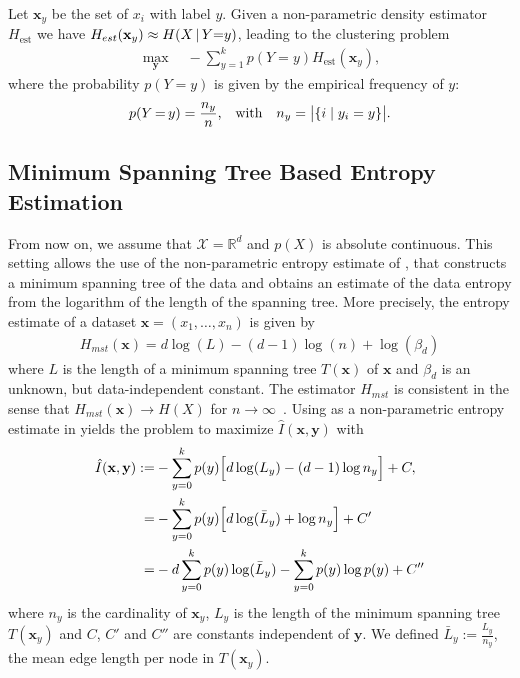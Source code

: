 Let $\mathbf{x}_y$ be the set of $x_i$ with label $y$. 
Given a non-parametric density estimator $H_\text{est}$
we have $H_{est}(\mathbf{x}_y) \approx H(X \, | \, Y {=} y)$, leading to the clustering problem
\begin{align}\label{eq:general_objective}
     \max_{\mathbf{y}}\quad - \sum_{y=1}^k p(Y{=}y) H_\text{est}(\mathbf{x}_y),
\end{align}
where the probability $p(Y{=}y)$ is given by the empirical frequency of $y$: 
\[
    p(Y\,{=}\,y)= \frac{n_y}{n} \text{,\quad with\quad} n_y = \bigl|\{i \mid y_i = y \}\bigr|.
\]

\subsection{Minimum Spanning Tree Based Entropy Estimation}
From now on, we assume that $\mathcal{X}=\mathbb{R}^d$ and $p(X)$ is
absolute continuous.
This setting allows the use of the non-parametric entropy estimate of
\citet{hero1999asymptotic}, that constructs a minimum spanning tree of the data
and obtains an estimate of the data entropy from the logarithm of the length of
the spanning tree.
%
More precisely, the entropy estimate of a dataset $\mathbf{x} = (x_1, \dotsc, x_n)$ is given by
\begin{align}\label{eq:hmst}
    H_{mst}(\mathbf{x}) = d \log(L) - (d-1) \log(n) + \log(\beta_d)
\end{align}
where $L$ is the length of a minimum spanning tree $T(\mathbf{x})$ of $\mathbf{x}$ and $\beta_d$ is an
unknown, but data-independent constant.
The estimator $H_{mst}$ is consistent in the sense that $H_{mst}(\mathbf{x}) \rightarrow H(X)$
for $n \rightarrow \infty$~\citep{hero1999asymptotic}.
Using  as a non-parametric entropy estimate in  yields
the problem to maximize $\hat{I}(\mathbf{x}, \mathbf{y})$ with
\begin{align}\label{eq:objective}
     \hat{I}(\mathbf{x}, \mathbf{y}) := & -\sum_{y=0}^k p(y) \Bigl[ d \log(L_y) - (d-1) \log{n_y} \Bigr] + C,\\
    = & - \sum_{y=0}^k p(y) \Bigl[ d \log(\bar{L}_y  ) + \log{n_y} \Bigr] + C'\\
    = & - d \sum_{y=0}^k p(y) \log(\bar{L}_y  ) - \sum_{y=0}^k p(y) \log{p(y) + C''} \label{eq:objective_simplified}
\end{align}
where $n_y$ is the cardinality of $\mathbf{x}_y$, $L_y$ is the length of the
minimum spanning tree $T(\mathbf{x}_y)$ and $C$, $C'$ and $C''$ are constants independent of
$\mathbf{y}$.  We defined $\bar{L}_y := \frac{L_y}{n_y}$, the mean edge length
per node in $T(\mathbf{x}_y)$.

